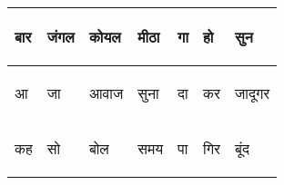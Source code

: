 \documentclass{article}
\begin{document}
\begin{table}[h]
\begin{tabular}{|l|l|l|l|l|l|l|}
\hline
\begin{hindi} बार \end{hindi} & \begin{hindi} जंगल \end{hindi} & \begin{hindi} कोयल \end{hindi} & \begin{hindi} मीठा \end{hindi} & \begin{hindi} गा \end{hindi} & \begin{hindi} हो \end{hindi} & \begin{hindi} सुन \end{hindi} \\ \hline 
\begin{hindi} आ \end{hindi} & \begin{hindi} जा \end{hindi} & \begin{hindi} आवाज \end{hindi} & \begin{hindi} सुना \end{hindi} & \begin{hindi} दा \end{hindi} & \begin{hindi} कर \end{hindi} & \begin{hindi} जादूगर \end{hindi} \\ \hline 
\begin{hindi} कह \end{hindi} & \begin{hindi} सो \end{hindi} & \begin{hindi} बोल \end{hindi} & \begin{hindi} समय \end{hindi} & \begin{hindi} पा \end{hindi} & \begin{hindi} गिर \end{hindi} & \begin{hindi} बूंद \end{hindi} \\ \hline 

\end{tabular}
\end{table}
\end{document}
